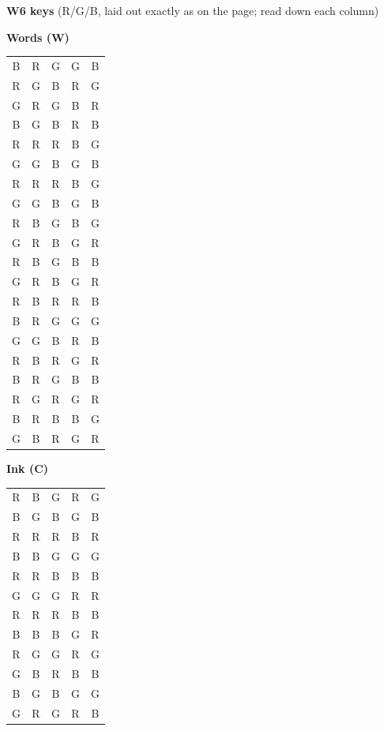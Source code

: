 \documentclass[10pt,a4paper]{article}
\begin{document}
\textbf{W6 keys} (R/G/B, laid out exactly as on the page; read down each column)\par\medskip\begin{minipage}[t]{0.3\linewidth}\centering\textbf{Words (W)}\\[2pt]\ttfamily\footnotesize\begin{tabular}{ccccc}B & R & G & G & B\\
R & G & B & R & G\\
G & R & G & B & R\\
B & G & B & R & B\\
R & R & R & B & G\\
G & G & B & G & B\\
R & R & R & B & G\\
G & G & B & G & B\\
R & B & G & B & G\\
G & R & B & G & R\\
R & B & G & B & B\\
G & R & B & G & R\\
R & B & R & R & B\\
B & R & G & G & G\\
G & G & B & R & B\\
R & B & R & G & R\\
B & R & G & B & B\\
R & G & R & G & R\\
B & R & B & B & G\\
G & B & R & G & R\\\end{tabular}\end{minipage}\hfill\begin{minipage}[t]{0.3\linewidth}\centering\textbf{Ink (C)}\\[2pt]\ttfamily\footnotesize\begin{tabular}{ccccc}R & B & G & R & G\\
B & G & B & G & B\\
R & R & R & B & R\\
B & B & G & G & G\\
R & R & B & B & B\\
G & G & G & R & R\\
R & R & R & B & B\\
B & B & B & G & R\\
R & G & G & R & G\\
G & B & R & B & B\\
B & G & B & G & G\\
G & R & G & R & B\\

\end{tabular}
\end{minipage}
\end{document}
